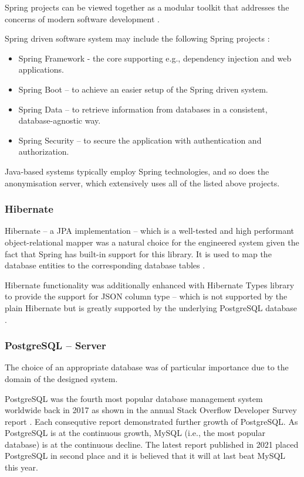 \documentclass[a4paper,twoside,12pt]{book}
\begin{document}
Spring projects can be viewed together as a modular toolkit that addresses the concerns of modern software development \cite{bib:spring_in_action}.

Spring driven software system may include the following Spring projects \cite{bib:spring_docs}:
\begin{itemize}
\item Spring Framework - the core supporting e.g., dependency injection and web applications.
\item Spring Boot – to achieve an easier setup of the Spring driven system.
\item Spring Data – to retrieve information from databases in a consistent, database-agnostic way.
\item Spring Security – to secure the application with authentication and authorization.
\end{itemize}

Java-based systems typically employ Spring technologies, and so does the anonymisation server, which extensively uses all of the listed above projects. 

\subsubsection{Hibernate}

Hibernate – a JPA implementation – which is a well-tested and high performant \cite{bib:hibernate_high_performance} object-relational mapper was a natural choice for the engineered system given the fact that Spring has built-in support for this library. It is used to map the database entities to the corresponding database tables \cite{bib:hibernate_docs}.

Hibernate functionality was additionally enhanced with Hibernate Types library \cite{bib:hibernate_types} to provide the support for JSON column type – which is not supported by the plain Hibernate but is greatly supported by the underlying PostgreSQL database \cite{bib:postgresql_json}.

\subsubsection{PostgreSQL – Server}

The choice of an appropriate database was of particular importance due to the domain of the designed system.

PostgreSQL was the fourth most popular database management system worldwide back in 2017 as shown in the annual Stack Overflow Developer Survey report \cite{bib:stackoverflow2017}. Each consequtive report demonstrated further growth of PostgreSQL. As PostgreSQL is at the continuous growth, MySQL (i.e., the most popular database) is at the continuous decline. The latest report published in 2021 \cite{bib:stackoverflow2021} placed PostgreSQL in second place and it is believed that it will at last beat MySQL this year.
\end{document}
